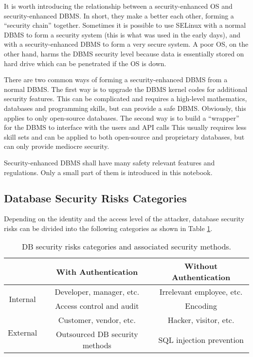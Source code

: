 \begin{shortbox}
It is worth introducing the relationship between a security-enhanced OS and security-enhanced DBMS. In short, they make a better each other, forming a ``security chain'' together. Sometimes it is possible to use SELinux with a normal DBMS to form a security system (this is what was used in the early days), and with a security-enhanced DBMS to form a very secure system. A poor OS, on the other hand, harms the DBMS security level because data is essentially stored on hard drive which can be penetrated if the OS is down.

There are two common ways of forming a security-enhanced DBMS from a normal DBMS. The first way is to upgrade the DBMS kernel codes for additional security features. This can be complicated and requires a high-level mathematics, databases and programming skills, but can provide a safe DBMS. Obviously, this applies to only open-source databases. The second way is to build a ``wrapper'' for the DBMS to interface with the users and API calls This usually requires less skill sets and can be applied to both open-source and proprietary databases, but can only provide mediocre security.

Security-enhanced DBMS shall have many safety relevant features and regulations. Only a small part of them is introduced in this notebook.
\end{shortbox}

\subsection{Database Security Risks Categories}

Depending on the identity and the access level of the attacker, database security risks can be divided into the following categories as shown in Table \ref{ch:securityaccessories:tab:dbsecurityriskscategories}.
\begin{table}
	\centering \caption{DB security risks categories and associated security methods.} \label{ch:securityaccessories:tab:dbsecurityriskscategories}
	\begin{tabular}{|c|c|c|}
		\hline
			& With Authentication & Without Authentication \\ \hline
		\multirow{2}{*}{Internal} & Developer, manager, etc. & Irrelevant employee, etc. \\
		& Access control and audit & Encoding \\ \hline
		\multirow{2}{*}{External} & Customer, vendor, etc. & Hacker, visitor, etc. \\
		& Outsourced DB security methods & SQL injection prevention \\
		\hline
	\end{tabular}
\end{table}

